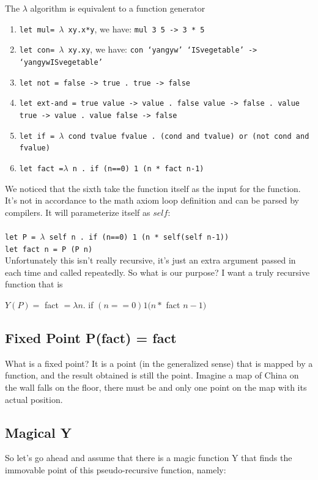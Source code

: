 \documentclass[a4paper]{exam}
\begin{document}
The $\lambda$ algorithm is equivalent to a function generator
\begin{enumerate}
    \item \texttt{let mul= $\lambda$ xy.x*y}, we have: \texttt{mul 3 5 -> 3 * 5}
    \item \texttt{let con= $\lambda$ xy.xy}, we have: \texttt{con ‘yangyw’ ‘ISvegetable’ -> ‘yangywISvegetable’}
    \item \texttt{let not = false -> true . true -> false}
    \item \texttt{let ext-and = true value -> value . false value -> false . value true -> value . value false -> false}
    \item \texttt{let if = $\lambda$ cond tvalue fvalue . (cond and tvalue) or (not cond and fvalue)}
    \item \texttt{let fact =$\lambda$ n . if (n==0) 1 (n * fact n-1)}
\end{enumerate}
We noticed that the sixth take the function itself as the input for the function. It's not in accordance to the math axiom loop definition and can be parsed by compilers. It will parameterize itself as $self$:
\\
\\
\texttt{let P = $\lambda$ self n . if (n==0) 1 (n * self(self n-1))}\\
\texttt{let fact n = P (P n)}
\\

Unfortunately this isn't really recursive, it's just an extra argument passed in each time and called repeatedly. So what is our purpose? I want a truly recursive function that is

\begin{solution}
$Y(P)=$ fact $=\lambda n .$ if $(n==0) 1(n *$ fact
$n-1)$
\end{solution}

\subsection{Fixed Point P(fact) = fact}
What is a fixed point? It is a point (in the generalized sense) that is mapped by a function, and the result obtained is still the point. Imagine a map of China on the wall falls on the floor, there must be and only one point on the map with its actual position.
\subsection{Magical Y}
So let's go ahead and assume that there is a magic function Y that finds the immovable point of this pseudo-recursive function, namely:
\end{document}
